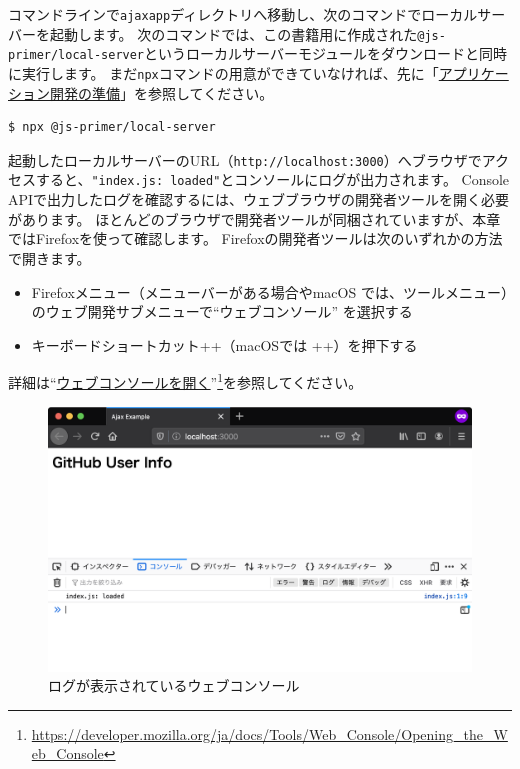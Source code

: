 コマンドラインで\texttt{ajaxapp}ディレクトリへ移動し、次のコマンドでローカルサーバーを起動します。
次のコマンドでは、この書籍用に作成された\texttt{@js-primer/local-server}というローカルサーバーモジュールをダウンロードと同時に実行します。
まだ\texttt{npx}コマンドの用意ができていなければ、先に「\hyperlink{setup-local-env}{アプリケーション開発の準備}」を参照してください。

\begin{lstlisting}
$ npx @js-primer/local-server
\end{lstlisting}

起動したローカルサーバーのURL（\texttt{http://localhost:3000}）へブラウザでアクセスすると、\texttt{"index.js: loaded"}とコンソールにログが出力されます。
Console
APIで出力したログを確認するには、ウェブブラウザの開発者ツールを開く必要があります。
ほとんどのブラウザで開発者ツールが同梱されていますが、本章ではFirefoxを使って確認します。
Firefoxの開発者ツールは次のいずれかの方法で開きます。

\begin{itemize}
\item
  Firefoxメニュー（メニューバーがある場合やmacOS
  では、ツールメニュー）のウェブ開発サブメニューで``ウェブコンソール''
  を選択する
\item
  キーボードショートカット++（macOSでは
  ++）を押下する
\end{itemize}

詳細は``\href{https://developer.mozilla.org/ja/docs/Tools/Web_Console/Opening_the_Web_Console}{ウェブコンソールを開く}''\footnote{\url{https://developer.mozilla.org/ja/docs/Tools/Web_Console/Opening_the_Web_Console}}を参照してください。

\begin{figure}[h]
\centering
\includegraphics[width=120mm]{fig/fig-1.png}
\caption{ログが表示されているウェブコンソール}
\end{figure}

